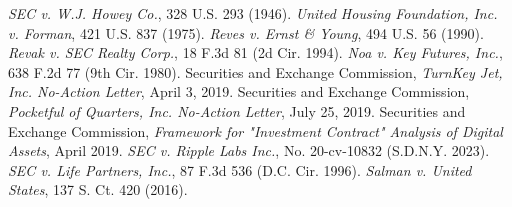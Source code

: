\documentclass[a4paper,12pt]{article}
\begin{document}
\begin{thebibliography}{99}
 \emph{SEC v. W.J. Howey Co.}, 328 U.S. 293 (1946).
 \emph{United Housing Foundation, Inc. v. Forman}, 421 U.S. 837 (1975).
 \emph{Reves v. Ernst \& Young}, 494 U.S. 56 (1990).
 \emph{Revak v. SEC Realty Corp.}, 18 F.3d 81 (2d Cir. 1994).
 \emph{Noa v. Key Futures, Inc.}, 638 F.2d 77 (9th Cir. 1980).
 Securities and Exchange Commission, \emph{TurnKey Jet, Inc. No-Action Letter}, April 3, 2019.
 Securities and Exchange Commission, \emph{Pocketful of Quarters, Inc. No-Action Letter}, July 25, 2019.
 Securities and Exchange Commission, \emph{Framework for "Investment Contract" Analysis of Digital Assets}, April 2019.
 \emph{SEC v. Ripple Labs Inc.}, No. 20-cv-10832 (S.D.N.Y. 2023).
 \emph{SEC v. Life Partners, Inc.}, 87 F.3d 536 (D.C. Cir. 1996).
 \emph{Salman v. United States}, 137 S. Ct. 420 (2016).
\end{thebibliography}
\end{document}
